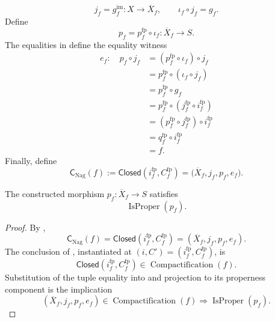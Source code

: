 \begin{definition}
  \[
    j_f=g_f^{\mathrm{im}}\colon X\longrightarrow\overline X_f,
    \qquad
    \iota_f\circ j_f=g_f.
  \]
  Define
  \[
    p_f=p_f^{\mathrm{fp}}\circ\iota_f
      \colon\overline X_f\longrightarrow S.
  \]
  The equalities in
  define the equality witness
  \[
  \begin{aligned}
    e_f\colon\quad p_f\circ j_f
      &=(p_f^{\mathrm{fp}}\circ\iota_f)\circ j_f\\
      &=p_f^{\mathrm{fp}}\circ(\iota_f\circ j_f)\\
      &=p_f^{\mathrm{fp}}\circ g_f\\
      &=p_f^{\mathrm{fp}}\circ
        (j_f^{\mathrm{fp}}\circ i_f^{\mathrm{fp}})\\
      &=(p_f^{\mathrm{fp}}\circ j_f^{\mathrm{fp}})
        \circ i_f^{\mathrm{fp}}\\
      &=q_f^{\mathrm{fp}}\circ i_f^{\mathrm{fp}}\\
      &=f.
  \end{aligned}
  \]
  Finally, define
  \[
    \mathsf C_{\mathrm{Nag}}(f)
      :=\mathsf{Closed}(i_f^{\mathrm{fp}},C_f^{\mathrm{fp}})
      =\bigl(\overline X_f,j_f,p_f,e_f\bigr).
  \]
\end{definition}

\begin{lemma}
\checked
  \label{lemma:nagata-final-ambient-proper}

  The constructed morphism $p_f\colon\overline X_f\to S$ satisfies
  \[
    \operatorname{IsProper}(p_f).
  \]
\end{lemma}

\begin{proof}
\checked
  By ,
  \[
    \mathsf C_{\mathrm{Nag}}(f)
      =\mathsf{Closed}(i_f^{\mathrm{fp}},C_f^{\mathrm{fp}})
      =(\overline X_f,j_f,p_f,e_f).
  \]
  The conclusion of
  , instantiated at
  $(i,C')=(i_f^{\mathrm{fp}},C_f^{\mathrm{fp}})$, is
  \[
    \mathsf{Closed}(i_f^{\mathrm{fp}},C_f^{\mathrm{fp}})
      \in\operatorname{Compactification}(f).
  \]
  Substitution of the tuple equality into
   and projection to its properness
  component is the implication
  \[
    (\overline X_f,j_f,p_f,e_f)
      \in\operatorname{Compactification}(f)
      \Longrightarrow\operatorname{IsProper}(p_f).
  \]
\end{proof}

